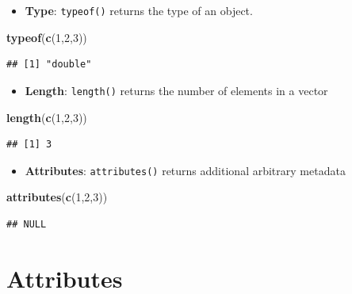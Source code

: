 \documentclass[]{book}
\newenvironment{Shaded}{\begin{snugshade}}{\end{snugshade}}
\newcommand{\KeywordTok}[1]{\textcolor[rgb]{0.13,0.29,0.53}{\textbf{{#1}}}}
\newcommand{\DecValTok}[1]{\textcolor[rgb]{0.00,0.00,0.81}{{#1}}}
\newcommand{\NormalTok}[1]{{#1}}
\providecommand{\tightlist}{%
  \setlength{\itemsep}{0pt}\setlength{\parskip}{0pt}}
\begin{document}
\begin{itemize}
\tightlist
\item
  \textbf{Type}: \texttt{typeof()} returns the type of an object.
\end{itemize}

\begin{Shaded}
\begin{Highlighting}[]
\KeywordTok{typeof}\NormalTok{(}\KeywordTok{c}\NormalTok{(}\DecValTok{1}\NormalTok{,}\DecValTok{2}\NormalTok{,}\DecValTok{3}\NormalTok{))}
\end{Highlighting}
\end{Shaded}

\begin{verbatim}
## [1] "double"
\end{verbatim}

\begin{itemize}
\tightlist
\item
  \textbf{Length}: \texttt{length()} returns the number of elements in a
  vector
\end{itemize}

\begin{Shaded}
\begin{Highlighting}[]
\KeywordTok{length}\NormalTok{(}\KeywordTok{c}\NormalTok{(}\DecValTok{1}\NormalTok{,}\DecValTok{2}\NormalTok{,}\DecValTok{3}\NormalTok{))}
\end{Highlighting}
\end{Shaded}

\begin{verbatim}
## [1] 3
\end{verbatim}

\begin{itemize}
\tightlist
\item
  \textbf{Attributes}: \texttt{attributes()} returns additional
  arbitrary metadata
\end{itemize}

\begin{Shaded}
\begin{Highlighting}[]
\KeywordTok{attributes}\NormalTok{(}\KeywordTok{c}\NormalTok{(}\DecValTok{1}\NormalTok{,}\DecValTok{2}\NormalTok{,}\DecValTok{3}\NormalTok{))}
\end{Highlighting}
\end{Shaded}

\begin{verbatim}
## NULL
\end{verbatim}

\section{Attributes}\label{attributes}
\end{document}

